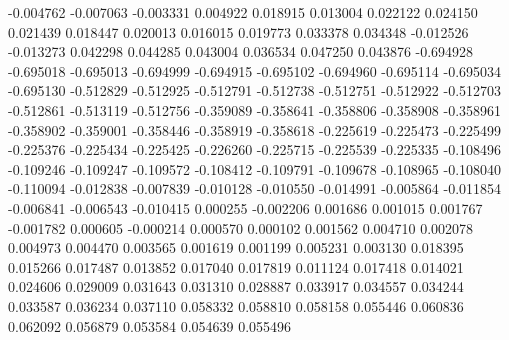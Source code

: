 -0.004762
-0.007063
-0.003331
0.004922
0.018915
0.013004
0.022122
0.024150
0.021439
0.018447
0.020013
0.016015
0.019773
0.033378
0.034348
-0.012526
-0.013273
0.042298
0.044285
0.043004
0.036534
0.047250
0.043876
-0.694928
-0.695018
-0.695013
-0.694999
-0.694915
-0.695102
-0.694960
-0.695114
-0.695034
-0.695130
-0.512829
-0.512925
-0.512791
-0.512738
-0.512751
-0.512922
-0.512703
-0.512861
-0.513119
-0.512756
-0.359089
-0.358641
-0.358806
-0.358908
-0.358961
-0.358902
-0.359001
-0.358446
-0.358919
-0.358618
-0.225619
-0.225473
-0.225499
-0.225376
-0.225434
-0.225425
-0.226260
-0.225715
-0.225539
-0.225335
-0.108496
-0.109246
-0.109247
-0.109572
-0.108412
-0.109791
-0.109678
-0.108965
-0.108040
-0.110094
-0.012838
-0.007839
-0.010128
-0.010550
-0.014991
-0.005864
-0.011854
-0.006841
-0.006543
-0.010415
0.000255
-0.002206
0.001686
0.001015
0.001767
-0.001782
0.000605
-0.000214
0.000570
0.000102
0.001562
0.004710
0.002078
0.004973
0.004470
0.003565
0.001619
0.001199
0.005231
0.003130
0.018395
0.015266
0.017487
0.013852
0.017040
0.017819
0.011124
0.017418
0.014021
0.024606
0.029009
0.031643
0.031310
0.028887
0.033917
0.034557
0.034244
0.033587
0.036234
0.037110
0.058332
0.058810
0.058158
0.055446
0.060836
0.062092
0.056879
0.053584
0.054639
0.055496
